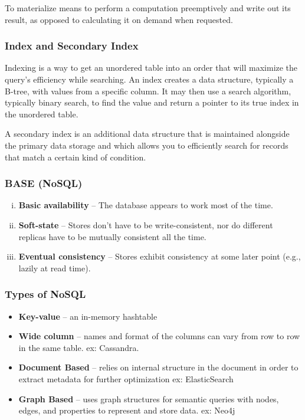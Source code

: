 \documentclass{article}
\begin{document}
    To materialize means to perform a computation preemptively and write out its result, as opposed to calculating it on demand when requested.
    
    \subsubsection{Index and Secondary Index}
    Indexing is a way to get an unordered table into an order that will maximize the query’s efficiency while searching. An index creates a data structure, typically a B-tree, with values from a specific column. It may then use a search algorithm, typically binary search, to find the value and return a pointer to its true index in the unordered table.
    
    A secondary index is an additional data structure that is maintained alongside the primary data storage and which allows you to efficiently search for records that match a certain kind of condition.
    
    \subsubsection{BASE (NoSQL)}
    \begin{enumerate}[i.]
        \item \textbf{Basic availability} -- The database appears to work most of the time.
        \item \textbf{Soft-state} -- Stores don’t have to be write-consistent, nor do different replicas have to be mutually consistent all the time.
        \item \textbf{Eventual consistency} -- Stores exhibit consistency at some later point (e.g., lazily at read time).
    \end{enumerate}
    
    \subsubsection{Types of NoSQL}
    \begin{itemize}
        \item \textbf{Key-value} -- an in-memory hashtable 
        \item \textbf{Wide column} -- names and format of the columns can vary from row to row in the same table. ex: Cassandra. 
        \item \textbf{Document Based} --  relies on internal structure in the document in order to extract metadata for further optimization ex: ElasticSearch
        \item \textbf{Graph Based} -- uses graph structures for semantic queries with nodes, edges, and properties to represent and store data. ex: Neo4j
    \end{itemize}
    
\end{document}

